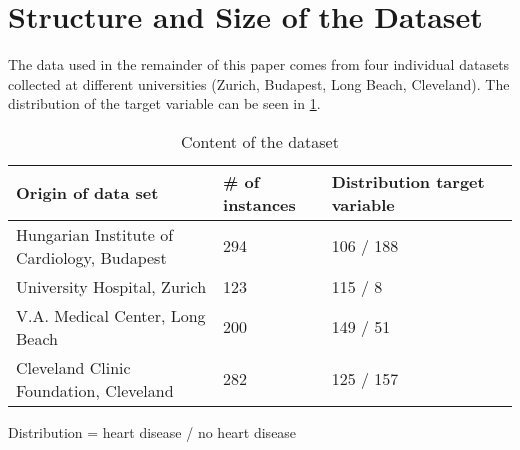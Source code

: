 \section{Structure and Size of the Dataset} \label{sec:dataUnderstanding}


The data used in the remainder of this paper comes from four individual datasets collected at different universities (Zurich, Budapest, Long Beach, Cleveland). The distribution of the target variable can be seen in \cref{table:datasets}.
\begin{table}[h]

    \begin{footnotesize}
        \begin{tabular}{|l|l|l|l|}
            \hline
            \textbf{Origin of data set}              & \textbf{\# of instances} & \textbf{Distribution target variable} \\ \hline
            Hungarian Institute of Cardiology, Budapest & 294                      & 106 / 188                             \\ \hline
            University Hospital, Zurich                 & 123                      & 115 / 8                               \\ \hline
            V.A. Medical Center, Long Beach             & 200                      & 149 / 51                              \\ \hline
            Cleveland Clinic Foundation, Cleveland      & 282                      & 125 / 157                             \\ \hline
        \end{tabular}
    \end{footnotesize}
    \begin{center}
        \centering
        Distribution = heart disease / no heart disease
    \end{center}
    \caption{Content of the dataset}
    \label{table:datasets}
\end{table}



